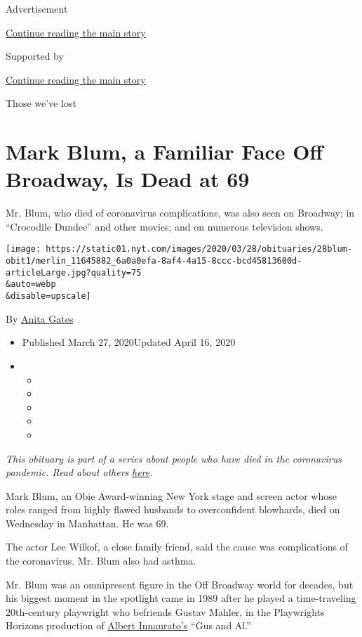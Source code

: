 Advertisement

\protect\hyperlink{after-top}{Continue reading the main story}

Supported by

\protect\hyperlink{after-sponsor}{Continue reading the main story}

Those we've lost

\hypertarget{mark-blum-a-familiar-face-off-broadway-is-dead-at-69}{%
\section{Mark Blum, a Familiar Face Off Broadway, Is Dead at
69}\label{mark-blum-a-familiar-face-off-broadway-is-dead-at-69}}

Mr. Blum, who died of coronavirus complications, was also seen on
Broadway; in ``Crocodile Dundee'' and other movies; and on numerous
television shows.

\texttt{[image: https://static01.nyt.com/images/2020/03/28/obituaries/28blum-obit1/merlin\_11645882\_6a0a0efa-8af4-4a15-8ccc-bcd45813600d-articleLarge.jpg?quality=75\\\&auto=webp\\\&disable=upscale]}

By \href{https://www.nytimes.com/by/anita-gates}{Anita Gates}

\begin{itemize}
\item
  Published March 27, 2020Updated April 16, 2020
\item
  \begin{itemize}
  \item
  \item
  \item
  \item
  \item
  \end{itemize}
\end{itemize}

\emph{This obituary is part of a series about people who have died in
the coronavirus pandemic. Read about others}
\href{https://www.nytimes.com/series/people-who-have-died-of-the-coronavirus}{\emph{here}}\emph{.}

Mark Blum, an Obie Award-winning New York stage and screen actor whose
roles ranged from highly flawed husbands to overconfident blowhards,
died on Wednesday in Manhattan. He was 69.

The actor Lee Wilkof, a close family friend, said the cause was
complications of the coronavirus. Mr. Blum also had asthma.

Mr. Blum was an omnipresent figure in the Off Broadway world for
decades, but his biggest moment in the spotlight came in 1989 after he
played a time-traveling 20th-century playwright who befriends Gustav
Mahler, in the Playwrights Horizons production of
\href{https://www.nytimes.com/2017/09/27/theater/albert-innaurato-dead-playwright-who-had-hits-on-broadway-in-70s.html}{Albert
Innaurato's} ``Gus and Al.''

